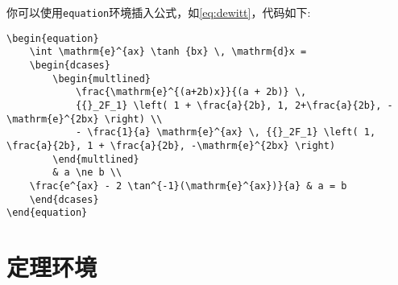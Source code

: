 你可以使用\verb|equation|环境插入公式，如\cref{eq:dewitt}，代码如下:
\begin{lstlisting}
\begin{equation}
    \int \mathrm{e}^{ax} \tanh {bx} \, \mathrm{d}x =
    \begin{dcases}
        \begin{multlined}
            \frac{\mathrm{e}^{(a+2b)x}}{(a + 2b)} \,
            {{}_2F_1} \left( 1 + \frac{a}{2b}, 1, 2+\frac{a}{2b}, -\mathrm{e}^{2bx} \right) \\
            - \frac{1}{a} \mathrm{e}^{ax} \, {{}_2F_1} \left( 1, \frac{a}{2b}, 1 + \frac{a}{2b}, -\mathrm{e}^{2bx} \right)
        \end{multlined}
        & a \ne b \\
    \frac{e^{ax} - 2 \tan^{-1}(\mathrm{e}^{ax})}{a} & a = b
    \end{dcases}
\end{equation}
\end{lstlisting}

\section{定理环境}




